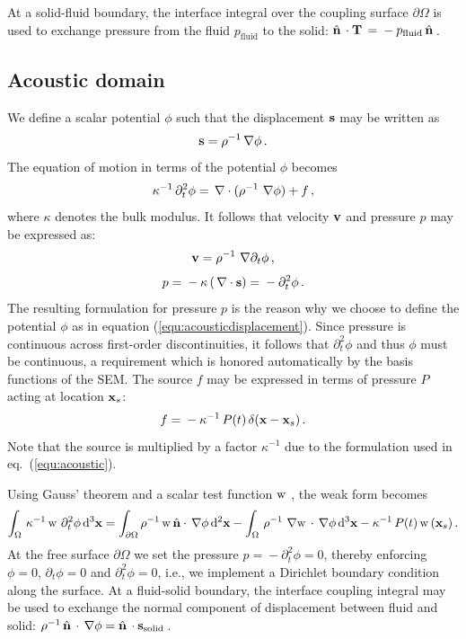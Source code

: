\documentclass[referee,extra]{gji}
\newcommand{\bequ}{\begin{equation} }
\newcommand{\eequ}{\end{equation} }
\newcommand{\intOmega}{\int_\Omega \, }
\newcommand{\intSurface}{\int_{\partial \Omega}}
\newcommand{\bnabla}{ \, {\bf \nabla } }
\newcommand{\bs}{ {\bf s } }
\newcommand{\bT}{ {\bf T } }
\newcommand{\bx}{ {\bf x } }
\newcommand{\bv}{ {\bf v } }
\newcommand{\bnormal}{ \hat{ \bf{n} } \, }
\newcommand{\testw}{ {\rm w } \, }
\begin{document}
At a solid-fluid boundary, the interface
integral over the coupling surface $\partial \Omega$ is used to exchange pressure from the fluid $p_\mathrm{fluid}$ to the solid:
$ \bnormal \cdot \bT \, = \mbox{}-p_\mathrm{fluid}\,\bnormal $.


\subsection{Acoustic domain}\label{subsec:acoustic}

We define a scalar potential $\phi$ such that the displacement $\bs$ may be written as
\bequ \label{equ:acousticdisplacement}
\bs  =   \rho^{-1} \bnabla \phi \, .
\eequ
The equation of motion in terms of the potential $\phi$ becomes
\bequ \label{equ:acoustic}
\kappa^{-1}\, \partial_t^2 \phi = \bnabla \cdot ( \rho^{-1}\, \bnabla \phi ) + f \,,
\eequ
where $\kappa$ denotes the bulk modulus.
It follows that velocity $\bv$ and pressure $p$ may be expressed as:
\bequ
 \bv   =   \rho^{-1}\,\bnabla \partial_t \phi\, ,
 \eequ
\bequ
  p  =   \mbox{} - \kappa\, (\bnabla \cdot \bs ) =  \mbox{}- \partial_t^2 \phi\, .  \label{equ:pressure}
\eequ
The resulting formulation for pressure $p$ is the reason why we choose to define the potential $\phi$ as in equation (\ref{equ:acousticdisplacement}).
Since pressure is continuous across first-order discontinuities,
it follows that $\partial_t^2 \phi$ and thus $\phi$ must be continuous, a requirement which is
honored automatically by the basis functions of the SEM.
The source $f$ may be expressed in terms of pressure $P$ acting at location $\bx_s$:
\bequ \label{equ:pressuresource}
f = \mbox{}-\kappa^{-1}\, P(t)\, \delta(\bx - \bx_s )\, .
\eequ
Note that the source is multiplied by a factor $\kappa^{-1}$ due to the formulation used in eq.~(\ref{equ:acoustic}).

Using Gauss' theorem and a scalar test function $\testw$\,, the weak form becomes
\bequ \label{equ:acousticweak}
\intOmega \kappa^{-1}\,\testw\, \partial_t^2\phi\, \mathrm{d}^3\bx =
 \intSurface \rho^{-1}\,\testw \hat{\bf n} \cdot \bnabla \phi \, \mathrm{d}^2\bx
- \intOmega  \rho^{-1} \,\bnabla \testw\cdot\bnabla \phi \, \mathrm{d}^3\bx
-  \kappa^{-1}  \, P(t)\, \testw (\bx_s) \,.
\eequ
At the free surface $\partial \Omega$ we set the pressure $p = \mbox{}- \partial_t^2 \phi = 0$,
thereby enforcing $\phi = 0$, $\partial_t \phi = 0$ and $\partial_t^2 \phi = 0$, i.e.,
we implement a Dirichlet boundary condition along the surface.
At a fluid-solid boundary,
the interface coupling integral may be used to exchange the normal component of displacement between fluid and solid:
$\rho^{-1}\,\bnormal\cdot\bnabla \phi = \bnormal\cdot\bs_\mathrm{solid} $\,.
\end{document}
